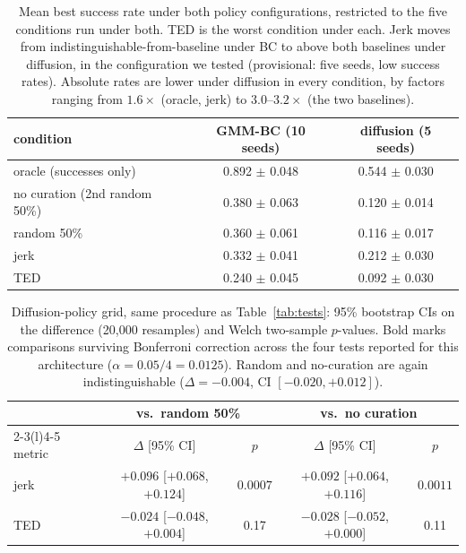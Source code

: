 \documentclass[10pt]{article}
\begin{document}
\begin{table}[t]
\centering
\small
\begin{tabular}{lcc}
\toprule
condition & GMM-BC (10 seeds) & diffusion (5 seeds) \\
\midrule
oracle (successes only) & 0.892 $\pm$ 0.048 & 0.544 $\pm$ 0.030 \\
\midrule
no curation (2nd random 50\%) & 0.380 $\pm$ 0.063 & 0.120 $\pm$ 0.014 \\
random 50\%             & 0.360 $\pm$ 0.061 & 0.116 $\pm$ 0.017 \\
\midrule
jerk                    & 0.332 $\pm$ 0.041 & 0.212 $\pm$ 0.030 \\
TED                     & 0.240 $\pm$ 0.045 & 0.092 $\pm$ 0.030 \\
\bottomrule
\end{tabular}
\caption{Mean best success rate under both policy configurations, restricted to the
five conditions run under both. TED is the worst condition under each. Jerk
moves from indistinguishable-from-baseline under BC to above both baselines
under diffusion, in the configuration we tested (provisional: five seeds,
low success rates). Absolute rates are lower under diffusion in every
condition, by factors ranging from $1.6\times$ (oracle, jerk) to
$3.0$--$3.2\times$ (the two baselines).}
\label{tab:crossarch}
\end{table}

\begin{table}[t]
\centering
\small
\begin{tabular}{lcccc}
\toprule
& \multicolumn{2}{c}{vs.\ random 50\%} & \multicolumn{2}{c}{vs.\ no curation} \\
\cmidrule(lr){2-3}\cmidrule(l){4-5}
metric & $\Delta$ [95\% CI] & $p$ & $\Delta$ [95\% CI] & $p$ \\
\midrule
jerk & $+0.096$ [$+0.068$, $+0.124$] & $\mathbf{0.0007}$ & $+0.092$ [$+0.064$, $+0.116$] & $\mathbf{0.0011}$ \\
TED  & $-0.024$ [$-0.048$, $+0.004$] & 0.17 & $-0.028$ [$-0.052$, $+0.000$] & 0.11 \\
\bottomrule
\end{tabular}
\caption{Diffusion-policy grid, same procedure as Table~\ref{tab:tests}:
95\% bootstrap CIs on the difference (20{,}000 resamples) and Welch
two-sample $p$-values. Bold marks comparisons surviving Bonferroni
correction across the four tests reported for this architecture
($\alpha = 0.05/4 = 0.0125$). Random and no-curation are again
indistinguishable ($\Delta = -0.004$, CI $[-0.020, +0.012]$).}
\label{tab:crossarch_tests}
\end{table}
\end{document}
